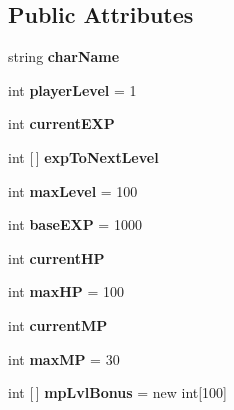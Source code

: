 \subsection*{Public Attributes}
\begin{DoxyCompactItemize}
\item 
\mbox{\label{class_char_stats_a8c2e64120d4a45ad3cce62df6cf9868e}} 
string {\bfseries char\+Name}
\item 
\mbox{\label{class_char_stats_aa16b59bfdd6c2ee58b786e5a2a61f93b}} 
int {\bfseries player\+Level} = 1
\item 
\mbox{\label{class_char_stats_ae976a35d8ece48ac55b0b6b439b1277b}} 
int {\bfseries current\+E\+XP}
\item 
\mbox{\label{class_char_stats_a00bd43c515b12a2abd9251fa426bc523}} 
int \mbox{[}$\,$\mbox{]} {\bfseries exp\+To\+Next\+Level}
\item 
\mbox{\label{class_char_stats_ab90480aec8b9460d48e81fb78473c54a}} 
int {\bfseries max\+Level} = 100
\item 
\mbox{\label{class_char_stats_a5f9742257a4c06a4f7e24a55f9de50c3}} 
int {\bfseries base\+E\+XP} = 1000
\item 
\mbox{\label{class_char_stats_a7b5442b26e9f581f63f067e32c7ac7ad}} 
int {\bfseries current\+HP}
\item 
\mbox{\label{class_char_stats_a26b99879c35b46d58db5434fbed256bb}} 
int {\bfseries max\+HP} = 100
\item 
\mbox{\label{class_char_stats_a90c60a8665cfba5971d0b7ea555c91f3}} 
int {\bfseries current\+MP}
\item 
\mbox{\label{class_char_stats_aa41459a88b1c4a0b4e70d15298462ff7}} 
int {\bfseries max\+MP} = 30
\item 
\mbox{\label{class_char_stats_ad656454b5bbdbc005df33957b000e4af}} 
int \mbox{[}$\,$\mbox{]} {\bfseries mp\+Lvl\+Bonus} = new int\mbox{[}100\mbox{]}

\end{DoxyCompactItemize}
